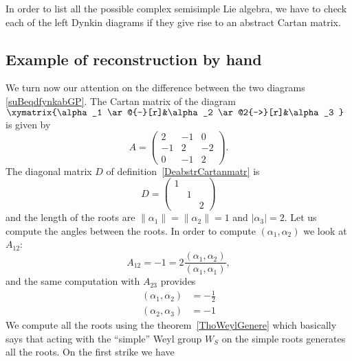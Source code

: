 In order to list all the possible complex semisimple Lie algebra, we have to check each of the left Dynkin diagrams if they give rise to an abstract Cartan matrix.



\subsection{Example of reconstruction by hand}
\label{subsecRecbyhanfd}

We turn now our attention on the difference between the two diagrams \eqref{suBeqdfynkabGP}. The Cartan matrix of the diagram $
	\xymatrix{%
		\alpha_1 \ar@{-}[r]&\alpha_2 \ar@2{->}[r]&\alpha_3
	}   $ is given by
\begin{equation}
	A=\begin{pmatrix}
		2  & -1 & 0  \\
		-1 & 2  & -2 \\
		0  & -1 & 2
	\end{pmatrix}.
\end{equation}
The diagonal matrix \( D\) of definition~\ref{DeabstrCartanmatr} is
\begin{equation}
	D=\begin{pmatrix}
		1 &   &   \\
		  & 1 &   \\
		  &   & 2
	\end{pmatrix}
\end{equation}
and the length of the roots are \( \| \alpha_1 \|=\| \alpha_2 \|=1\) and \( | \alpha_3 |=2\). Let us compute the angles between the roots. In order to compute \( (\alpha_1,\alpha_2)\) we look at \( A_{12}\):
\begin{equation}
	A_{12}=-1=2\frac{ (\alpha_1,\alpha_2) }{ (\alpha_1,\alpha_1) },
\end{equation}
and the same computation with \( A_{23}\) provides
\begin{subequations}
	\begin{align}
		(\alpha_1,\alpha_2) & =-\frac{ 1 }{2} \\
		(\alpha_2,\alpha_3) & =-1
	\end{align}
\end{subequations}
We compute all the roots using the theorem~\ref{ThoWeylGenere} which basically says that acting with the ``simple'' Weyl group \( W_S\) on the simple roots generates all the roots. On the first strike we have
